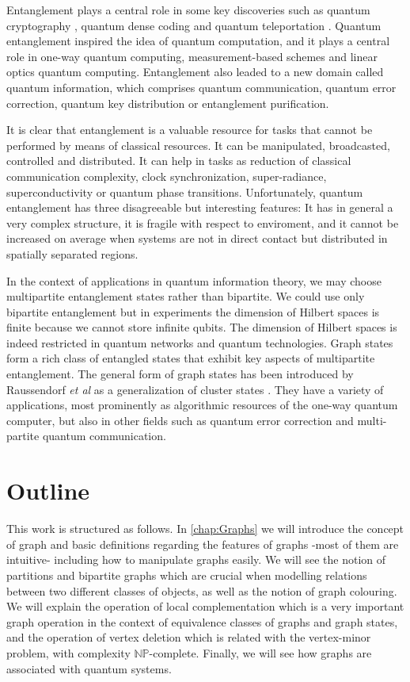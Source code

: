 \documentclass[10pt,a4paper]{book}
\numberwithin{equation}{chapter}
\numberwithin{figure}{chapter}
\numberwithin{table}{chapter}
\begin{document}
Entanglement plays a central role in some key discoveries such as quantum cryptography \cite{crypto}, quantum dense coding \cite{densecoding} and quantum teleportation \cite{teleportation}. Quantum entanglement inspired the idea of quantum computation, and it plays a central role in one-way quantum computing, measurement-based schemes and linear optics quantum computing. Entanglement also leaded to a new domain called quantum information, which comprises quantum communication, quantum error correction, quantum key distribution or entanglement purification.

It is clear that entanglement is a valuable resource for tasks that cannot be performed by means of classical resources. It can be manipulated, broadcasted, controlled and distributed. It can help in tasks as reduction of classical communication complexity, clock synchronization, super-radiance, superconductivity or quantum phase transitions. Unfortunately, quantum entanglement has three disagreeable but interesting features: It has in general a very complex structure, it is fragile with respect to enviroment, and it cannot be increased on average when systems are not in direct contact but distributed in spatially separated regions.

In the context of applications in quantum information theory, we may choose multipartite entanglement states rather than bipartite. We could use only bipartite entanglement but in experiments the dimension of Hilbert spaces is finite because we cannot store infinite qubits. The dimension of Hilbert spaces is indeed restricted in quantum networks and quantum technologies. Graph states form a rich class of entangled states that exhibit key aspects of multipartite entanglement. The general form of graph states has been introduced by Raussendorf \textit{et al} \cite{graph} as a generalization of cluster states \cite{cluster}. They have a variety of applications, most prominently as algorithmic resources of the one-way quantum computer, but also in other fields such as quantum error correction and multi-partite quantum communication. 

\section{Outline}
This work is structured as follows. In \autoref{chap:Graphs} we will introduce the concept of graph \cite{Diestel} and basic definitions regarding the features of graphs -most of them are intuitive- including how to manipulate graphs easily. We will see the notion of partitions and bipartite graphs which are crucial when modelling relations between two different classes of objects, as well as the notion of graph colouring. We will explain the operation of local complementation which is a very important graph operation in the context of equivalence classes of graphs and graph states, and the operation of vertex deletion which is related with the vertex-minor problem, with complexity $\mathbb{NP}$-complete. Finally, we will see how graphs are associated with quantum systems.
\end{document}
